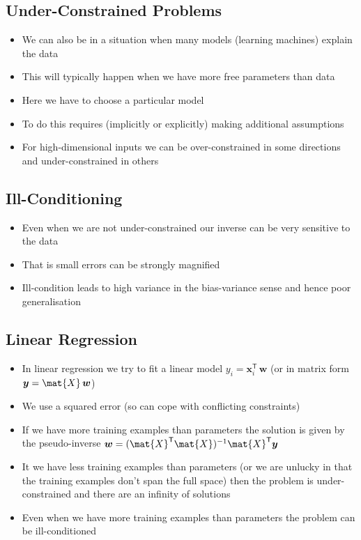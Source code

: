 \documentclass[11pt]{article}
\newcommand{\tr}{\textsf{T}}
\begin{document}
\subsection{Under-Constrained Problems}
\label{sec:org7051429}
\begin{itemize}
\item We can also be in a situation when many models (learning
machines) explain the data
\item This will typically happen when we have more free parameters than data
\item Here we have to choose a particular model
\item To do this requires (implicitly or explicitly) making additional
assumptions
\item For high-dimensional inputs we can be over-constrained
in some directions and under-constrained in others
\end{itemize}

\subsection{Ill-Conditioning}
\label{sec:org94e1006}
\begin{itemize}
\item Even when we are not under-constrained our inverse can be very sensitive to the data
\item That is small errors can be strongly magnified
\item Ill-condition leads to high variance in the bias-variance sense and hence poor generalisation
\end{itemize}

\subsection{Linear Regression}
\label{sec:org5dabf46}
\begin{itemize}
\item In linear regression we try to fit a linear model \(y_i = \bm{x}_i^\tr\,\bm{w}\)
(or in matrix form \(\bm{y} = \mat{X}\,\bm{w}\))
\item We use a squared error (so can cope with conflicting constraints)
\item If we have more training examples than parameters the solution is given by the pseudo-inverse
\(\bm{w} = (\mat{X}^\tr \mat{X})^{-1} \mat{X}^\tr \bm{y}\)
\item It we have less training examples than parameters (or we are
unlucky in that the training examples don't span the full space)
then the problem is under-constrained and there are an infinity
of solutions
\item Even when we have more training examples than parameters the
problem can be ill-conditioned
\end{itemize}
\end{document}
